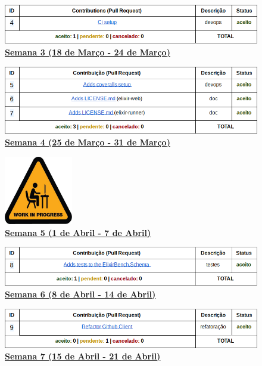 \begin{figure}
  \caption{\textbf{\underline{Semana 3 (18 de Março - 24 de Março)}}}
  \includegraphics[width=\linewidth]{figuras/contribs-3.png}
\end{figure}

\begin{figure}
  \caption{\textbf{\underline{Semana 4 (25 de Março - 31 de Março)}}}
  \includegraphics[width=\linewidth]{figuras/contribs-4.png}
\end{figure}

\begin{figure}
  \caption{\textbf{\underline{Semana 5 (1 de Abril - 7 de Abril)}}}
  \centering
  \includegraphics[width=30mm, scale=0.5]{figuras/loading.png}
\end{figure}

\begin{figure}
  \caption{\textbf{\underline{Semana 6 (8 de Abril - 14 de Abril)}}}
  \includegraphics[width=\linewidth]{figuras/contribs-5.png}
\end{figure}

\begin{figure}
  \caption{\textbf{\underline{Semana 7 (15 de Abril - 21 de Abril)}}}
  \includegraphics[width=\linewidth]{figuras/contribs-6.png}
\end{figure}

